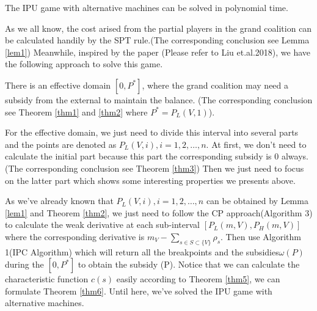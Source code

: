 \begin{thm}\label{thm6}

The IPU game with alternative machines can be solved in polynomial time.

\end{thm}


As we all know, the cost arised from the partial players in the grand coalition can be calculated handily by the SPT rule.(The corresponding conclusion see Lemma \ref{lem1}) Meanwhile, inspired by the paper (Please refer to Liu et.al.2018), we have the following approach to solve this game.


There is an effective domain $[0, P^*]$, where the grand coalition may need a subsidy from the external to maintain the balance.
(The corresponding conclusion see Theorem \ref{thm1} and \ref{thm2} where $P^* = P_L(V,1)$).


For the effective domain, we just need to divide this interval into several parts and the points are denoted as $P_L(V,i), i = 1,2,\ldots,n$.  At first, we don't need to calculate the initial part because this part the corresponding subsidy is 0 always.(The corresponding conclusion see Theorem \ref{thm3}) Then we just need to focus on the latter part which shows some interesting properties we presents above.


As we've already known that $P_L(V,i), i = 1,2,\ldots,n$ can be obtained by Lemma \ref{lem1} and Theorem \ref{thm2}, we just need to follow the CP approach(Algorithm 3) to calculate the weak derivative at each sub-interval $[P_L(m,V),P_H(m,V)]$ where the corresponding derivative is $m_V-\sum_{s\in S\subset\{V\}} \rho_s$. Then use Algorithm 1(IPC Algorithm) which will return all the breakpoints and the subsidies$\omega(P)$ during the $[0, P^*]$ to obtain the subsidy \omega(P). Notice that we can calculate the characteristic function $c(s)$ easily according to Theorem \ref{thm5}, we can formulate Theorem \ref{thm6}. Until here, we've solved the IPU game with alternative machines.

